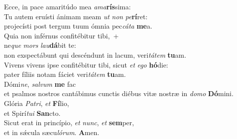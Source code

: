 \oddverse Ecce, in pace amaritúdo mea \textit{a}\textit{ma}\textbf{rís}sima:\\
\evenverse Tu autem eruísti ánimam meam \textit{ut} \textit{non} \textit{pe}\textbf{rí}ret:~\*\\
\evenverse projecísti post tergum tuum ómnia pec\textit{cá}\textit{ta} \textbf{me}a.\\
\oddverse Quia non inférnus confitébitur tibi,~+\\
\oddverse  ne\textit{que} \textit{mors} \textit{lau}\textbf{dá}bit te:~\*\\
\oddverse non exspectábunt qui descéndunt in lacum, veri\textit{tá}\textit{tem} \textbf{tu}am.\\
\evenverse Vivens vivens ipse confitébitur tibi, sicut \textit{et} \textit{e}\textit{go} \textbf{hó}die:~\*\\
\evenverse pater fíliis notam fáciet veri\textit{tá}\textit{tem} \textbf{tu}am.\\
\oddverse Dómi\textit{ne}, \textit{sal}\textit{vum} \textbf{me} fac~\*\\
\oddverse et psalmos nostros cantábimus cunctis diébus vitæ nostræ in \textit{do}\textit{mo} \textbf{Dó}mini.\\
\evenverse Glória \textit{Pa}\textit{tri}, \textit{et} \textbf{Fí}lio,~\*\\
\evenverse et Spirí\textit{tu}\textit{i} \textbf{San}cto.\\
\oddverse Sicut erat in princípio, \textit{et} \textit{nunc}, \textit{et} \textbf{sem}per,~\*\\
\oddverse et in sǽcula sæcu\textit{ló}\textit{rum}. \textbf{A}men.\\
